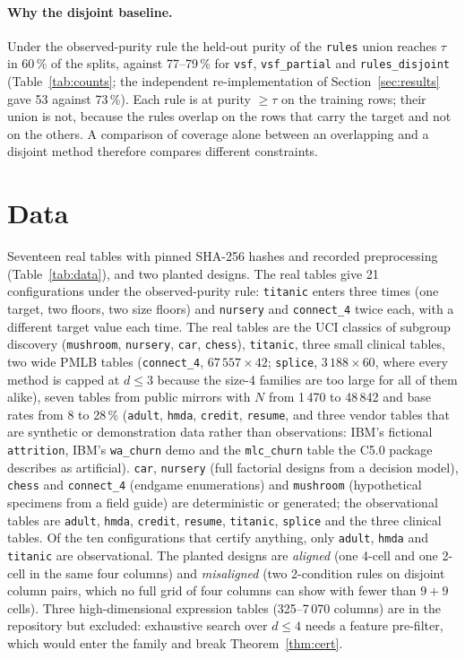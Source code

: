 \documentclass[11pt]{article}
\begin{document}
\paragraph{Why the disjoint baseline.} Under the observed-purity rule the held-out purity of the \texttt{rules} union reaches $\tau$ in 60\,\% of the splits, against 77--79\,\% for \texttt{vsf}, \texttt{vsf\_partial} and \texttt{rules\_disjoint} (Table~\ref{tab:counts}; the independent re-implementation of Section~\ref{sec:results} gave 53 against 73\,\%). Each rule is at purity $\ge\tau$ on the training rows; their union is not, because the rules overlap on the rows that carry the target and not on the others. A comparison of coverage alone between an overlapping and a disjoint method therefore compares different constraints.

\section{Data}\label{sec:data}
Seventeen real tables with pinned SHA-256 hashes and recorded preprocessing (Table~\ref{tab:data}), and two planted designs. The real tables give 21 configurations under the observed-purity rule: \texttt{titanic} enters three times (one target, two floors, two size floors) and \texttt{nursery} and \texttt{connect\_4} twice each, with a different target value each time. The real tables are the UCI classics of subgroup discovery (\texttt{mushroom}, \texttt{nursery}, \texttt{car}, \texttt{chess}), \texttt{titanic}, three small clinical tables, two wide PMLB tables (\texttt{connect\_4}, $67\,557\times42$; \texttt{splice}, $3\,188\times60$, where every method is capped at $d\le3$ because the size-4 families are too large for all of them alike), seven tables from public mirrors with $N$ from 1\,470 to 48\,842 and base rates from 8 to 28\,\% (\texttt{adult}, \texttt{hmda}, \texttt{credit}, \texttt{resume}, and three vendor tables that are synthetic or demonstration data rather than observations: IBM's fictional \texttt{attrition}, IBM's \texttt{wa\_churn} demo and the \texttt{mlc\_churn} table the C5.0 package describes as artificial). \texttt{car}, \texttt{nursery} (full factorial designs from a decision model), \texttt{chess} and \texttt{connect\_4} (endgame enumerations) and \texttt{mushroom} (hypothetical specimens from a field guide) are deterministic or generated; the observational tables are \texttt{adult}, \texttt{hmda}, \texttt{credit}, \texttt{resume}, \texttt{titanic}, \texttt{splice} and the three clinical tables. Of the ten configurations that certify anything, only \texttt{adult}, \texttt{hmda} and \texttt{titanic} are observational. The planted designs are \emph{aligned} (one 4-cell and one 2-cell in the same four columns) and \emph{misaligned} (two 2-condition rules on disjoint column pairs, which no full grid of four columns can show with fewer than $9+9$ cells). Three high-dimensional expression tables (325--7\,070 columns) are in the repository but excluded: exhaustive search over $d\le4$ needs a feature pre-filter, which would enter the family and break Theorem~\ref{thm:cert}.
\end{document}
